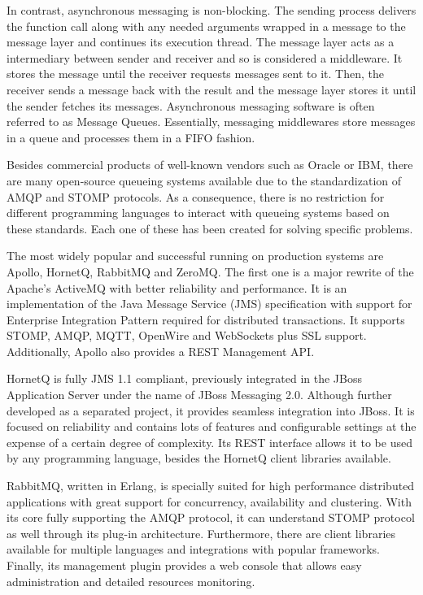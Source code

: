 In contrast, asynchronous messaging is non-blocking. The sending process delivers the function call along with any needed arguments wrapped in a message to the message layer and continues its execution thread. The message layer acts as a intermediary between sender and receiver and so is considered a middleware. It stores the message until the receiver requests messages sent to it. Then, the receiver sends a message back with the result and the message layer stores it until the sender fetches its messages. Asynchronous messaging software is often referred to as Message Queues. Essentially, messaging middlewares store messages in a queue and processes them in a FIFO fashion.

Besides commercial products of well-known vendors such as Oracle or IBM, there are many open-source queueing systems available \cite{queues} due to the standardization of AMQP and STOMP protocols. As a consequence, there is no restriction for different programming languages to interact with queueing systems based on these standards. Each one of these has been created for solving specific problems.

The most widely popular and successful running on production systems are Apollo, HornetQ, RabbitMQ and ZeroMQ. The first one is a major rewrite of the Apache's ActiveMQ with better reliability and performance. It is an implementation of the Java Message Service (JMS) specification with support for Enterprise Integration Pattern required for distributed transactions. It supports STOMP, AMQP, MQTT, OpenWire and WebSockets plus SSL support. Additionally, Apollo also provides a REST Management API.

HornetQ is fully JMS 1.1 compliant, previously integrated in the JBoss Application Server under the name of JBoss Messaging 2.0. Although further developed as a separated project, it provides seamless integration into JBoss. It is focused on reliability and contains lots of features and configurable settings at the expense of a certain degree of complexity. Its REST interface allows it to be used by any programming language, besides the HornetQ client libraries available.

RabbitMQ, written in Erlang, is specially suited for high performance distributed applications with great support for concurrency, availability and clustering. With its core fully supporting the AMQP protocol, it can understand STOMP protocol as well through its plug-in architecture. Furthermore, there are client libraries available for multiple languages and integrations with popular frameworks. Finally, its management plugin provides a web console that allows easy administration and detailed resources monitoring.

